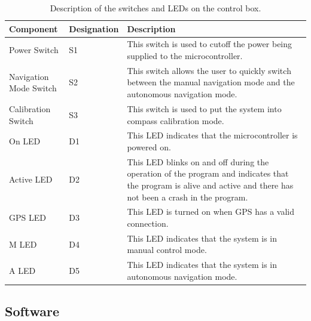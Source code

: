 	\begin{table}[ht]
	\begin{center}
		\caption{Description of the switches and LEDs on the control box.}
		\label{tab:3:controlBx}
		\begin{tabular}{|p{0.2\linewidth} | p{0.15\linewidth}|p{0.65\linewidth}|}
			\hline
			Component & Designation & Description \\
			\hline
			Power Switch & S1 & This switch is used to cutoff the power being supplied to the microcontroller. \\
			\hline
			Navigation Mode Switch & S2 & This switch allows the user to quickly switch between the manual navigation mode and the autonomous navigation mode. \\
			\hline
			Calibration Switch & S3 & This switch is used to put the system into compass calibration mode. \\
			\hline
			On LED & D1 & This LED indicates that the microcontroller is powered on. \\
			\hline
			Active LED & D2 & This LED blinks on and off during the operation of the program and indicates that the program is alive and active and there has not been a crash in the program. \\
			\hline
			GPS LED & D3 & This LED is turned on when GPS has a valid connection. \\
			\hline 
			M LED & D4 & This LED indicates that the system is in manual control mode. \\
			\hline
			A LED & D5 &  This LED indicates that the system is in autonomous navigation mode. \\
			\hline
		\end{tabular}
	\end{center}
\end{table}
	\subsection{Software}
